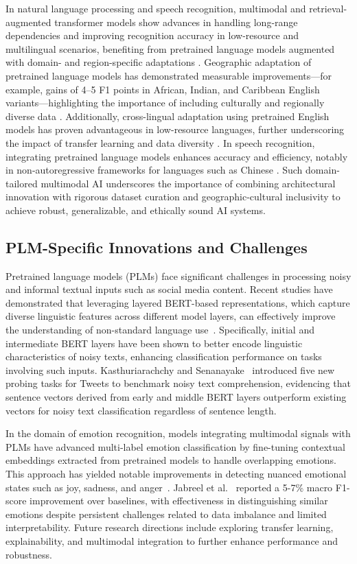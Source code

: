 \documentclass[sigconf]{acmart}
\begin{document}
In natural language processing and speech recognition, multimodal and retrieval-augmented transformer models show advances in handling long-range dependencies and improving recognition accuracy in low-resource and multilingual scenarios, benefiting from pretrained language models augmented with domain- and region-specific adaptations \cite{ref29,ref30,ref31,ref32}. Geographic adaptation of pretrained language models has demonstrated measurable improvements—for example, gains of 4–5 F1 points in African, Indian, and Caribbean English variants—highlighting the importance of including culturally and regionally diverse data \cite{ref30}. Additionally, cross-lingual adaptation using pretrained English models has proven advantageous in low-resource languages, further underscoring the impact of transfer learning and data diversity \cite{ref31}. In speech recognition, integrating pretrained language models enhances accuracy and efficiency, notably in non-autoregressive frameworks for languages such as Chinese \cite{ref32}. Such domain-tailored multimodal AI underscores the importance of combining architectural innovation with rigorous dataset curation and geographic-cultural inclusivity to achieve robust, generalizable, and ethically sound AI systems.

\subsection{PLM-Specific Innovations and Challenges}

Pretrained language models (PLMs) face significant challenges in processing noisy and informal textual inputs such as social media content. Recent studies have demonstrated that leveraging layered BERT-based representations, which capture diverse linguistic features across different model layers, can effectively improve the understanding of non-standard language use~\cite{ref37}. Specifically, initial and intermediate BERT layers have been shown to better encode linguistic characteristics of noisy texts, enhancing classification performance on tasks involving such inputs. Kasthuriarachchy and Senanayake~\cite{ref37} introduced five new probing tasks for Tweets to benchmark noisy text comprehension, evidencing that sentence vectors derived from early and middle BERT layers outperform existing vectors for noisy text classification regardless of sentence length.

In the domain of emotion recognition, models integrating multimodal signals with PLMs have advanced multi-label emotion classification by fine-tuning contextual embeddings extracted from pretrained models to handle overlapping emotions. This approach has yielded notable improvements in detecting nuanced emotional states such as joy, sadness, and anger~\cite{ref36}. Jabreel et al.~\cite{ref36} reported a 5-7\% macro F1-score improvement over baselines, with effectiveness in distinguishing similar emotions despite persistent challenges related to data imbalance and limited interpretability. Future research directions include exploring transfer learning, explainability, and multimodal integration to further enhance performance and robustness.
\end{document}
